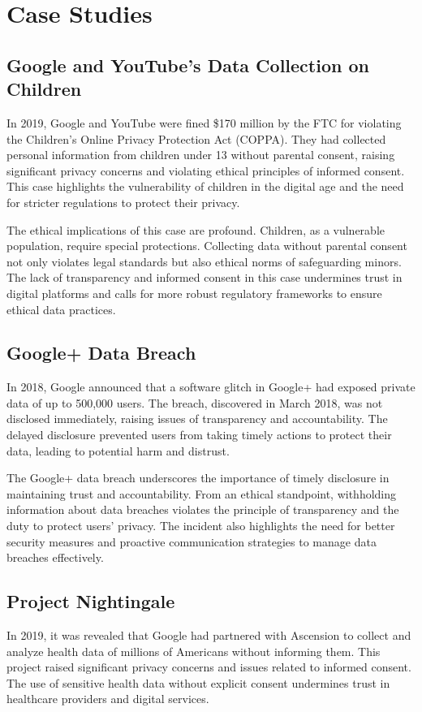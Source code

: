 \section{Case Studies}\label{sec:case-studies}

\subsection{Google and YouTube's Data Collection on Children}\label{subsec:google-and-youtube's-data-collection-on-children}
In 2019, Google and YouTube were fined \$170 million by the FTC for violating the Children’s Online Privacy Protection Act (COPPA). They had collected personal information from children under 13 without parental consent, raising significant privacy concerns and violating ethical principles of informed consent.
This case highlights the vulnerability of children in the digital age and the need for stricter regulations to protect their privacy.

The ethical implications of this case are profound.
Children, as a vulnerable population, require special protections.
Collecting data without parental consent not only violates legal standards but also ethical norms of safeguarding minors.
The lack of transparency and informed consent in this case undermines trust in digital platforms and calls for more robust regulatory frameworks to ensure ethical data practices.

\subsection{Google+ Data Breach}\label{subsec:google+-data-breach}
In 2018, Google announced that a software glitch in Google+ had exposed private data of up to 500,000 users.
The breach, discovered in March 2018, was not disclosed immediately, raising issues of transparency and accountability.
The delayed disclosure prevented users from taking timely actions to protect their data, leading to potential harm and distrust.

The Google+ data breach underscores the importance of timely disclosure in maintaining trust and accountability.
From an ethical standpoint, withholding information about data breaches violates the principle of transparency and the duty to protect users' privacy.
The incident also highlights the need for better security measures and proactive communication strategies to manage data breaches effectively.

\subsection{Project Nightingale}\label{subsec:project-nightingale}
In 2019, it was revealed that Google had partnered with Ascension to collect and analyze health data of millions of Americans without informing them.
This project raised significant privacy concerns and issues related to informed consent.
The use of sensitive health data without explicit consent undermines trust in healthcare providers and digital services.

